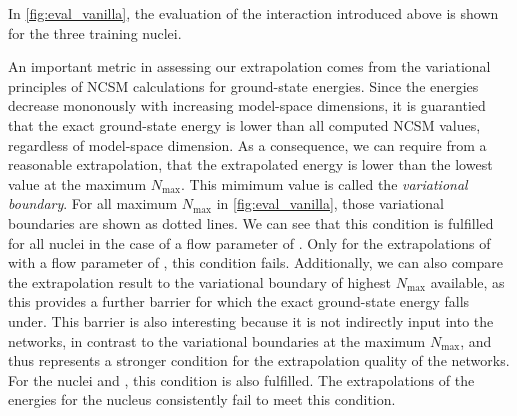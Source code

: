 In \autoref{fig:eval_vanilla}, the evaluation of the interaction introduced above is shown for the three training nuclei.

An important metric in assessing our extrapolation comes from the variational principles of NCSM calculations for ground-state energies. Since the energies decrease mononously with increasing model-space dimensions, it is guarantied that the exact ground-state energy is lower than all computed NCSM values, regardless of model-space dimension. As a consequence, we can require from a reasonable extrapolation, that the extrapolated energy is lower than the lowest value at the maximum $N_\mathrm{max}$. This mimimum value is called the \textit{variational boundary}. For all maximum $N_\mathrm{max}$ in \autoref{fig:eval_vanilla}, those variational boundaries are shown as dotted lines. We can see that this condition is fulfilled for all nuclei in the case of a flow parameter of . Only for the extrapolations of  with a flow parameter of , this condition fails. Additionally, we can also compare the extrapolation result to the variational boundary of highest $N_\mathrm{max}$ available, as this provides a further barrier for which the exact ground-state energy falls under. This barrier is also interesting because it is not indirectly input into the networks, in contrast to the variational boundaries at the maximum $N_\mathrm{max}$, and thus represents a stronger condition for the extrapolation quality of the networks. For the nuclei  and , this condition is also fulfilled. The extrapolations of the energies for the  nucleus consistently fail to meet this condition.

